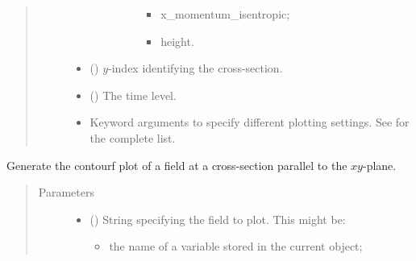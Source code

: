 \documentclass[letterpaper,10pt,english]{sphinxmanual}
\begin{document}
\begin{fulllineitems}
\begin{fulllineitems}
\begin{quote}
\begin{description}
\begin{itemize}
\begin{itemize}
\begin{description}
\begin{itemize}
\item {} 
x\_momentum\_isentropic;

\item {} 
height.

\end{itemize}

\end{description}

\end{itemize}


\item {} 
 () \textendash{} \(y\)-index identifying the cross-section.

\item {} 
 () \textendash{} The time level.

\item {} 
 \textendash{} Keyword arguments to specify different plotting settings.
See {\hyperref[\detokenize{api:tasmania.utils.utils_plot.contour_xz}]{}} for the complete list.

\end{itemize}

\end{description}\end{quote}

\end{fulllineitems}


\begin{fulllineitems}
\label{\detokenize{api:storages.state_isentropic.StateIsentropic.contourf_xy}}
Generate the contourf plot of a field at a cross-section parallel to the \(xy\)-plane.
\begin{quote}\begin{description}
\item[{Parameters}] \leavevmode\begin{itemize}
\item {} 
 () \textendash{} 
String specifying the field to plot. This might be:
\begin{itemize}
\item {} 
the name of a variable stored in the current object;


\end{itemize}
\end{itemize}
\end{description}
\end{quote}
\end{fulllineitems}
\end{fulllineitems}
\end{document}
